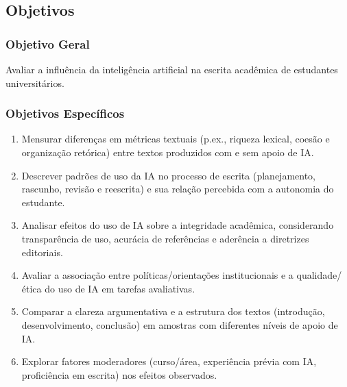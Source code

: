 \subsection{Objetivos}\label{sec:objetivos}

\subsubsection{Objetivo Geral}
Avaliar a influência da inteligência artificial na escrita acadêmica de estudantes universitários.

\subsubsection{Objetivos Específicos}
\begin{enumerate}
  \item Mensurar diferenças em métricas textuais (p.ex., riqueza lexical, coesão e organização retórica) entre textos produzidos com e sem apoio de IA. %
  \item Descrever padrões de uso da IA no processo de escrita (planejamento, rascunho, revisão e reescrita) e sua relação percebida com a autonomia do estudante. %
  \item Analisar efeitos do uso de IA sobre a integridade acadêmica, considerando transparência de uso, acurácia de referências e aderência a diretrizes editoriais. %
  \item Avaliar a associação entre políticas/orientações institucionais e a qualidade/ética do uso de IA em tarefas avaliativas. %
  \item Comparar a clareza argumentativa e a estrutura dos textos (introdução, desenvolvimento, conclusão) em amostras com diferentes níveis de apoio de IA. %
  \item Explorar fatores moderadores (curso/área, experiência prévia com IA, proficiência em escrita) nos efeitos observados. %
\end{enumerate}

